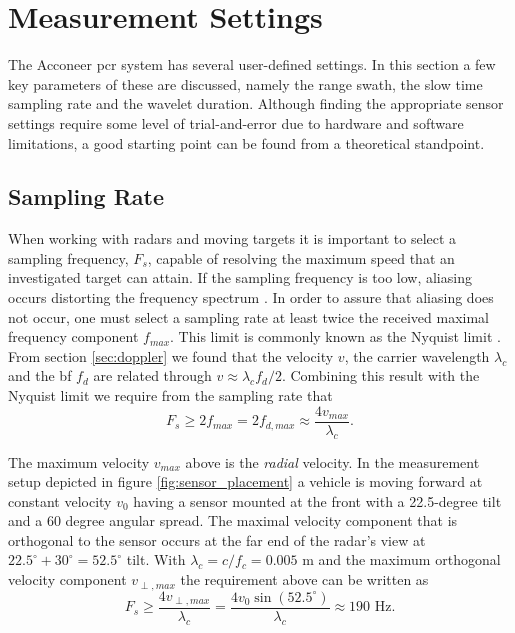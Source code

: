 \section{Measurement Settings}

The Acconeer \gls{pcr} system has several user-defined settings. In this section a few key parameters of these are discussed, namely the range swath, the slow time sampling rate and the wavelet duration. Although finding the appropriate sensor settings require some level of trial-and-error due to hardware and software limitations, a good starting point can be found from a theoretical standpoint. 

\subsection{Sampling Rate}\label{sec:srate}
When working with radars and moving targets it is important to select a sampling frequency, $F_s$, capable of resolving the maximum speed that an investigated target can attain. If the sampling frequency is too low, aliasing occurs distorting the frequency spectrum \citep{lindgren_rootzezn_sandsten_2014}. In order to assure that aliasing does not occur, one must select a sampling rate at least twice the received maximal frequency component $f_{max}$. This limit is commonly known as the Nyquist limit \citep{proakis_manolakis_1995}. From section \ref{sec:doppler} we found that the velocity $v$, the carrier wavelength $\lambda_c$ and the \gls{bf} $f_d$ are related through $v \approx \lambda_cf_d/2$. Combining this result with the Nyquist limit we require from the sampling rate that
\begin{equation}
	\label{eq:nyquist}
		F_{s} \geq 2f_{max} 
		= 2f_{d,max} 
		\approx \frac{4v_{max}}{\lambda_c}.
\end{equation}

The maximum velocity $v_{max}$ above is the \emph{radial} velocity. In the measurement setup depicted in figure \ref{fig:sensor_placement} a vehicle is moving forward at constant velocity $v_0$ having a sensor mounted at the front with a 22.5-degree tilt and a 60 degree angular spread. The maximal velocity component that is orthogonal to the sensor occurs at the far end of the radar's view at $22.5^\circ + 30^\circ = 52.5^\circ$ tilt. With $\lambda_c=c/f_c=0.005$ m and the maximum orthogonal velocity component $v_{\perp, max}$ the requirement above can be written as
\begin{equation}
	F_s \geq 
	\frac{4v_{\perp, max}}{\lambda_c}
	= \frac{4v_0\sin(52.5^\circ)}{\lambda_c} 
	\approx 190 \text{ Hz}.
\end{equation}

